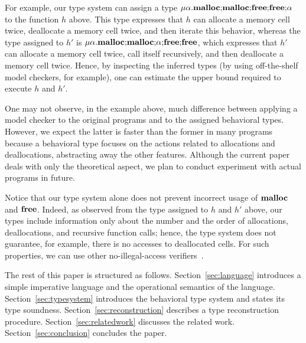 For example, our type system can assign a type
\(\mu\alpha.\mathbf{malloc};\!\mathbf{malloc};\!\mathbf{free};\!\mathbf{free};\!\alpha\) to
the function \(h\) above.  This type expresses that \(h\) can allocate
a memory cell twice, deallocate a memory cell twice, and then iterate
this behavior, whereas the type assigned to \(h'\) is
\(\mu\alpha.\mathbf{malloc};\!\mathbf{malloc};\!\alpha;\!\mathbf{free};\!\mathbf{free}\),
which expresses that \(h'\) can allocate a memory cell twice, call
itself recursively, and then deallocate a memory cell twice.  Hence,
by inspecting the inferred types (by using off-the-shelf model
checkers, for example), one can estimate the upper bound required to
execute \(h\) and \(h'\).


One may not observe, in the example above, much difference between
applying a model checker to the original programs and to the assigned
behavioral types.  However, we expect the latter is faster than the
former in many programs because a behavioral type focuses on the
actions related to allocations and deallocations, abstracting away the
other features.  Although the current paper deals with only the
theoretical aspect, we plan to conduct experiment with actual programs
in future.

Notice that our type system alone does not prevent incorrect usage of
\(\mathbf{malloc}\) and \(\mathbf{free}\).  Indeed, as observed from the type assigned
to \(h\) and \(h'\) above, our types include information only about
the number and the order of allocations, deallocations, and recursive
function calls; hence, the type system does not guarantee, for
example, there is no accesses to deallocated cells.  For such
properties, we can use other no-illegal-access verifiers~\cite{DBLP:conf/aplas/SuenagaK09}.

The rest of this paper is structured as
follows. Section~\ref{sec:language} introduces a simple imperative
language and the operational semantics of the
language. Section~\ref{sec:typesystem} introduces the behavioral type
system and states its type soundness. Section~\ref{sec:reconstruction}
describes a type reconstruction procedure.
Section~\ref{sec:relatedwork} discusses the related
work. Section~\ref{sec:conclusion} concludes the paper.


